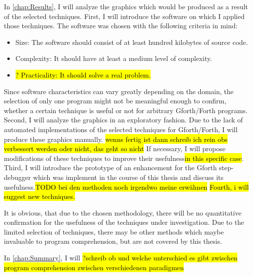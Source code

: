 In \autoref{chap:Results}, I will analyze the graphics which would be produced as a result of the selected techniques.
First, I will introduce the software on which I applied those techniques. The software was chosen with the following criteria in mind:
\begin{itemize}
\item Size: The software should consist of at least hundred kilobytes of source code.
\item Complexity: It should have at least a medium level of complexity.
\item \hl{? Practicality: It should solve a real problem.}
\end{itemize}
Since software characteristics can vary greatly depending on the domain, the selection of only one program might not be meaningful enough to confirm, whether a certain technique is useful or not for arbitrary Gforth/Forth programs.
Second, I will analyze the graphics in an exploratory fashion. Due to the lack of automated implementations of the selected techniques for Gforth/Forth, I will produce these graphics manually. \hl{wenns fertig ist dann schreib ich rein obs verbessert werden oder nicht, das geht so nicht} If necessary, I will propose modifications of these techniques to improve their usefulness\hl{in this specific case}.
Third, I will introduce the prototype of an enhancement for the Gforth step-debugger which was implement in the course of this thesis and discuss its usefulness.\hl{TODO bei den methoden noch irgendwo meine erwähnen}
\hl{Fourth, i will suggest new techniques.}

It is obvious, that due to the chosen methodology, there will be no quantitative confirmation for the usefulness of the techniques under investigation. Due to the limited selection of techniques, there may be other methods which maybe invaluable to program comprehension, but are not covered by this thesis.

In \autoref{chap:Summary}, I will \hl{?schreib ob und welche unterschied es gibt zwischen program comprehension zwischen verschiedenen paradigmen}